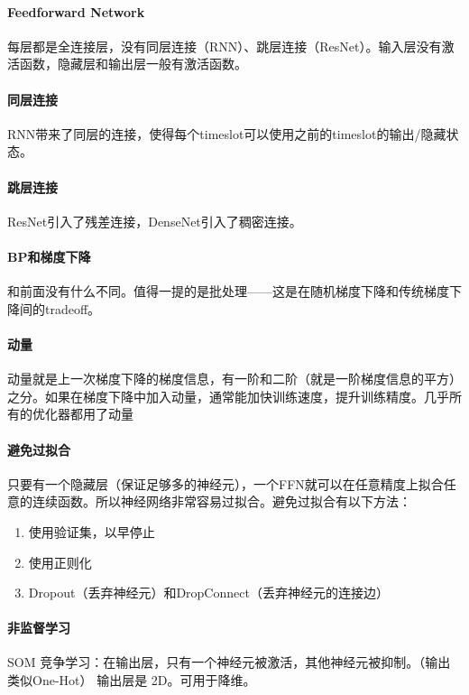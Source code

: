 \paragraph{Feedforward Network}
每层都是全连接层，没有同层连接（RNN）、跳层连接（ResNet）。输入层没有激活函数，隐藏层和输出层一般有激活函数。

\paragraph{同层连接}
RNN带来了同层的连接，使得每个timeslot可以使用之前的timeslot的输出/隐藏状态。

\paragraph{跳层连接}
ResNet引入了残差连接，DenseNet引入了稠密连接。

\paragraph{BP和梯度下降}
和前面没有什么不同。值得一提的是批处理——这是在随机梯度下降和传统梯度下降间的tradeoff。

\paragraph{动量}
动量就是上一次梯度下降的梯度信息，有一阶和二阶（就是一阶梯度信息的平方）之分。如果在梯度下降中加入动量，通常能加快训练速度，提升训练精度。几乎所有的优化器都用了动量

\paragraph{避免过拟合} 只要有一个隐藏层（保证足够多的神经元），一个FFN就可以在任意精度上拟合任意的连续函数。所以神经网络非常容易过拟合。避免过拟合有以下方法：
\begin{enumerate}
\item 使用验证集，以早停止
\item 使用正则化
\item Dropout（丢弃神经元）和DropConnect（丢弃神经元的连接边）
\end{enumerate}

\paragraph{非监督学习}
{SOM}
竞争学习：在输出层，只有一个神经元被激活，其他神经元被抑制。（输出类似One-Hot）
输出层是 2D。可用于降维。

